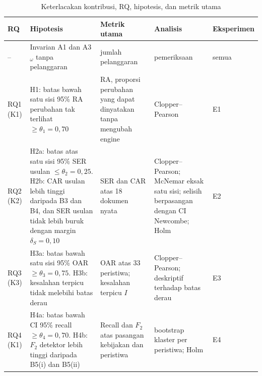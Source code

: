 \documentclass[journal,a4paper]{IEEEtran}
\makeatletter
\DeclareRobustCommand{\en}[1]{{\usefont{\f@encoding}{\f@family}{\f@series}{it}#1\/}}
\makeatother
\begin{document}
\begin{table}[t]
\centering
\caption{Keterlacakan kontribusi, RQ, hipotesis, dan metrik utama}
\label{tab:lacak}
\scriptsize
\begin{tabularx}{\textwidth}{@{}P{1.2cm} L P{4.0cm} P{3.6cm} P{1.3cm}@{}}
\toprule
\textbf{RQ} & \textbf{Hipotesis} & \textbf{Metrik utama} & \textbf{Analisis} & \textbf{Eksperimen} \\
\midrule
-- & Invarian A1 dan A3$_\omega$ tanpa pelanggaran & jumlah pelanggaran & pemeriksaan & semua \\
RQ1 (K1) & H1: batas bawah satu sisi 95\% RA perubahan tak terlihat $\geq \theta_1 = 0{,}70$ & RA, proporsi perubahan yang dapat dinyatakan tanpa mengubah \en{engine} & Clopper--Pearson & E1 \\
RQ2 (K2) & H2a: batas atas satu sisi 95\% SER usulan $\leq \theta_2 = 0{,}25$. H2b: CAR usulan lebih tinggi daripada B3 dan B4, dan SER usulan tidak lebih buruk dengan margin $\delta_S = 0{,}10$ & SER dan CAR atas 18 dokumen nyata & Clopper--Pearson; McNemar eksak satu sisi; selisih berpasangan dengan CI Newcombe; Holm & E2 \\
RQ3 (K3) & H3a: batas bawah satu sisi 95\% OAR $\geq \theta_3 = 0{,}75$. H3b: kesalahan terpicu tidak melebihi batas derau & OAR atas 33 peristiwa; kesalahan terpicu $I$ & Clopper--Pearson; deskriptif terhadap batas derau & E3 \\
RQ4 (K1) & H4a: batas bawah CI 95\% \en{recall} $\geq \theta_4 = 0{,}70$. H4b: $F_2$ detektor lebih tinggi daripada B5(i) dan B5(ii) & \en{Recall} dan $F_2$ atas pasangan kebijakan dan peristiwa & \en{bootstrap} klaster per peristiwa; Holm & E4 \\
\bottomrule
\end{tabularx}
\end{table}
\end{document}
